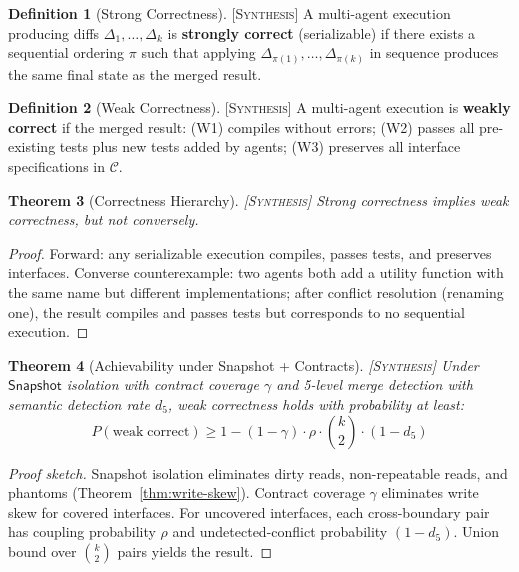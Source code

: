 \documentclass[11pt]{article}
\newtheorem{theorem}{Theorem}[section]
\theoremstyle{definition}
\newtheorem{definition}[theorem]{Definition}
\theoremstyle{remark}
\newcommand{\synthesis}{\textsc{[Synthesis]}}
\begin{document}
\begin{definition}[Strong Correctness] \synthesis{}
A multi-agent execution producing diffs $\Delta_1, \ldots, \Delta_k$ is \textbf{strongly correct} (serializable) if there exists a sequential ordering $\pi$ such that applying $\Delta_{\pi(1)}, \ldots, \Delta_{\pi(k)}$ in sequence produces the same final state as the merged result.
\end{definition}

\begin{definition}[Weak Correctness] \synthesis{}
A multi-agent execution is \textbf{weakly correct} if the merged result: (W1) compiles without errors; (W2) passes all pre-existing tests plus new tests added by agents; (W3) preserves all interface specifications in $\mathcal{C}$.
\end{definition}

\begin{theorem}[Correctness Hierarchy] \synthesis{}
\label{thm:correctness}
Strong correctness implies weak correctness, but not conversely.
\end{theorem}

\begin{proof}
Forward: any serializable execution compiles, passes tests, and preserves interfaces.
Converse counterexample: two agents both add a utility function with the same name but different implementations; after conflict resolution (renaming one), the result compiles and passes tests but corresponds to no sequential execution.
\end{proof}

\begin{theorem}[Achievability under Snapshot + Contracts] \synthesis{}
\label{thm:achievability}
Under $\mathsf{Snapshot}$ isolation with contract coverage $\gamma$ and 5-level merge detection with semantic detection rate $d_5$, weak correctness holds with probability at least:
\begin{equation}
  P(\mathrm{weak\;correct}) \geq 1 - (1-\gamma) \cdot \rho \cdot \binom{k}{2} \cdot (1 - d_5)
\end{equation}
\end{theorem}

\begin{proof}[Proof sketch]
Snapshot isolation eliminates dirty reads, non-repeatable reads, and phantoms (Theorem~\ref{thm:write-skew}).
Contract coverage $\gamma$ eliminates write skew for covered interfaces.
For uncovered interfaces, each cross-boundary pair has coupling probability $\rho$ and undetected-conflict probability $(1 - d_5)$.
Union bound over $\binom{k}{2}$ pairs yields the result.
\end{proof}
\end{document}

